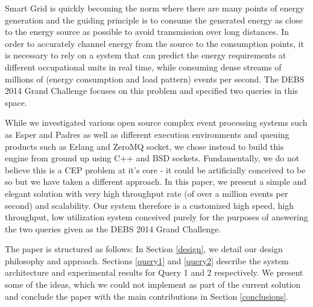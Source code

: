 Smart Grid is quickly becoming the norm where there are many points of energy generation and the guiding principle is to consume the generated energy as close to the energy source as possible to avoid transmission over long distances.
In order to accurately channel energy from the source to the consumption points, it is necessary to rely on a system that can predict the energy requirements at different occupational units in real time, while consuming dense streams of millions of (energy consumption and load pattern) events per second.
The DEBS 2014 Grand Challenge\cite{ziekow2014challenge} focuses on this problem and specified two queries in this space.

While we investigated various open source complex event processing systems such as Esper\cite{Esper} and Padres\cite{Padres} as well as different execution environments and queuing products such as Erlang\cite{erlang} and ZeroMQ \cite{zeromq} socket, we chose instead to build this engine from ground up using C++ and BSD sockets. Fundamentally, we do not believe this is a CEP problem at it's core - it could be artificially conceived to be so but we have taken a different approach. In this paper, we present a simple and elegant solution with very high throughput rate (of over a million events per second) and scalability. Our system therefore is a customized high speed, high throughput, low utilization system conceived purely for the purposes of answering the two queries given as the DEBS 2014 Grand Challenge.

The paper is structured as follows: In Section \ref{design}, we detail our design philosophy and approach. Sections \ref{query1} and \ref{query2} describe the system architecture and experimental results for Query 1 and 2 respectively.
We present some of the ideas, which we could not implement as part of the current solution and conclude the paper with the main contributions in Section \ref{conclusions}.
